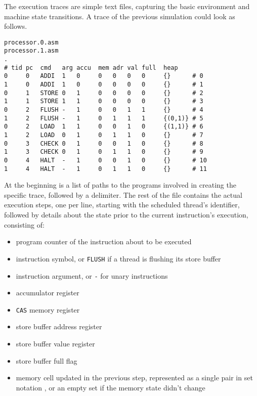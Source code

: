 The execution traces are simple text files, capturing the basic environment and machine state transitions.
A trace of the previous simulation could look as follows.

\begin{lstlisting}[language={[concubine]Assembler}, caption={Simple Output Trace}, label={lst:trace:simple}, xleftmargin=\parindent]
processor.0.asm
processor.1.asm
.
# tid pc  cmd   arg accu  mem adr val full  heap
0     0   ADDI  1   0     0   0   0   0     {}      # 0
1     0   ADDI  1   0     0   0   0   0     {}      # 1
0     1   STORE 0   1     0   0   0   0     {}      # 2
1     1   STORE 1   1     0   0   0   0     {}      # 3
0     2   FLUSH -   1     0   0   1   1     {}      # 4
1     2   FLUSH -   1     0   1   1   1     {(0,1)} # 5
0     2   LOAD  1   1     0   0   1   0     {(1,1)} # 6
1     2   LOAD  0   1     0   1   1   0     {}      # 7
0     3   CHECK 0   1     0   0   1   0     {}      # 8
1     3   CHECK 0   1     0   1   1   0     {}      # 9
0     4   HALT  -   1     0   0   1   0     {}      # 10
1     4   HALT  -   1     0   1   1   0     {}      # 11
\end{lstlisting}

At the beginning is a list of paths to the programs involved in creating the specific trace, followed by a delimiter.
The rest of the file contains the actual execution steps, one per line, starting with the scheduled thread's identifier, followed by details about the state prior to the current instruction's execution, consisting of:

\begin{itemize}
  \item program counter of the instruction about to be executed
  \item instruction symbol, or \texttt{FLUSH} if a thread is flushing its store buffer
  \item instruction argument, or \texttt{-} for unary instructions
  \item accumulator register
  \item \texttt{CAS} memory register
  \item store buffer address register
  \item store buffer value register
  \item store buffer full flag
  \item memory cell updated in the previous step, represented as a single pair in set notation \texttt{}, or an empty set \texttt{\string{\string}} if the memory state didn't change
\end{itemize}

